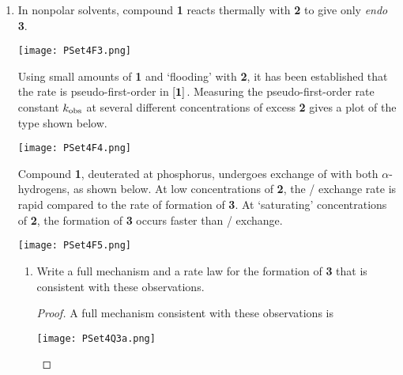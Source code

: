 \documentclass[../psets.tex]{subfiles}
\begin{document}
\begin{enumerate}
\begin{enumerate}
\begin{proof}
            It follows that the reaction in DMF --- which proceeds via the stepwise mechanism, per part (b) --- has both a higher enthalpy and entropy of activation. It makes sense that it should have a higher enthalpy of activation since the RDS involves the formation of a high-energy carbocation intermediate. It also makes sense that it should have a higher entropy of activation because the introduction of charged species into a polar aprotic solvent will disrupt the random bonding of the solvent to itself and introduce highly ordered ion cages.
        \end{proof}
    \end{enumerate}
    \pagebreak
    \item In nonpolar solvents, compound \textbf{1} reacts thermally with \textbf{2} to give only \emph{endo} \textbf{3}.
    \begin{center}
        \texttt{[image: PSet4F3.png]}
    \end{center}
    Using small amounts of \textbf{1} and `flooding' with \textbf{2}, it has been established that the rate is pseudo-first-order in $\cnc{\textbf{1}}$. Measuring the pseudo-first-order rate constant $k_\textup{obs}$ at several different concentrations of excess \textbf{2} gives a plot of the type shown below.
    \begin{center}
        \texttt{[image: PSet4F4.png]}
    \end{center}
    Compound \textbf{1}, deuterated at phosphorus, undergoes exchange of  with both $\alpha$-hydrogens, as shown below. At low concentrations of \textbf{2}, the / exchange rate is rapid compared to the rate of formation of \textbf{3}. At `saturating' concentrations of \textbf{2}, the formation of \textbf{3} occurs faster than / exchange.
    \begin{center}
        \texttt{[image: PSet4F5.png]}
    \end{center}
    \begin{enumerate}
        \item Write a full mechanism and a rate law for the formation of \textbf{3} that is consistent with these observations.
        \begin{proof}
            A full mechanism consistent with these observations is
            \begin{center}
                \texttt{[image: PSet4Q3a.png]}
            \end{center}

\end{proof}
\end{enumerate}
\end{enumerate}
\end{document}
